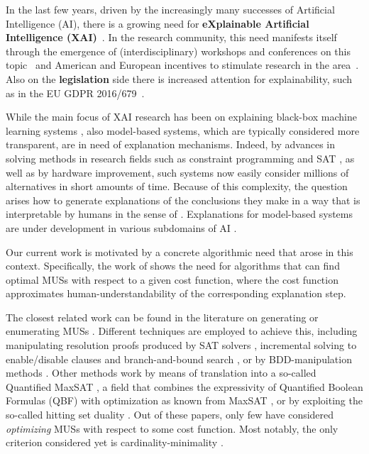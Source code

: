 
In the last few years, driven by the increasingly many successes of Artificial Intelligence (AI), there is a growing need for \textbf{eXplainable Artificial Intelligence (XAI)}~\cite{miller2019explanation}.
In the research community, this need manifests itself through the emergence of (interdisciplinary) workshops and conferences on this topic~\cite{xai-ijcai,FAT} and American and European incentives to stimulate research in the area~\cite{gunning2017explainable,hamonrobustness,chistera,fetproact}. 
Also on the \textbf{legislation} side there is increased attention for explainability, such as in the EU GDPR 2016/679~\cite{regulation2016regulation}.

While the main focus of XAI research has been on explaining black-box machine learning systems \cite{Barredo_Arrieta_2020,Adadi_2018}, also model-based systems, which are typically considered more transparent, are in need of explanation mechanisms. 
Indeed, by advances in solving methods in research fields such as constraint programming \cite{CP} and SAT \cite{DBLP:series/faia/2009-185}, as well as by hardware improvement, such systems now easily consider millions of alternatives in short amounts of time. 
Because of this complexity, the question arises how to generate explanations of the conclusions they make in a way that is interpretable by humans in the sense of \citet{DBLP:conf/dsaa/GilpinBYBSK18}. 
Explanations for model-based systems are under development in various subdomains of AI \cite{fox2017explainable,vcyras2019argumentation,chakraborti2017plan,winston2004operations,putnam2019toward}.

Our current work is motivated by a concrete algorithmic need that arose in this context. 
Specifically, the work of \citet{ecai/BogaertsGCG20} shows the need for algorithms that can find optimal MUSs with respect to a given cost function, where the cost function approximates human-understandability of the corresponding explanation step.

The closest related work can be found in the literature on generating or enumerating MUSs \cite{conf/sat/LynceM04}.
Different techniques are employed to achieve this, including  manipulating resolution proofs produced by SAT solvers \cite{goldberg,DBLP:journals/fmsd/GershmanKS08,DBLP:conf/sat/DershowitzHN06}, incremental solving to enable/disable clauses and branch-and-bound search \cite{DBLP:conf/dac/OhMASM04}, or by BDD-manipulation methods \cite{huang}.
Other methods work by means of translation into a so-called Quantified MaxSAT \cite{DBLP:journals/constraints/IgnatievJM16}, a field that combines the expressivity of Quantified Boolean Formulas (QBF)  with optimization as known from MaxSAT , or by exploiting the so-called hitting set duality \cite{ignatiev2015smallest}. 
Out of these papers, only few have considered \emph{optimizing} MUSs with respect to some cost function. Most notably, the only criterion considered yet is cardinality-minimality \cite{conf/sat/LynceM04,ignatiev2015smallest,DBLP:journals/constraints/IgnatievJM16}. 


